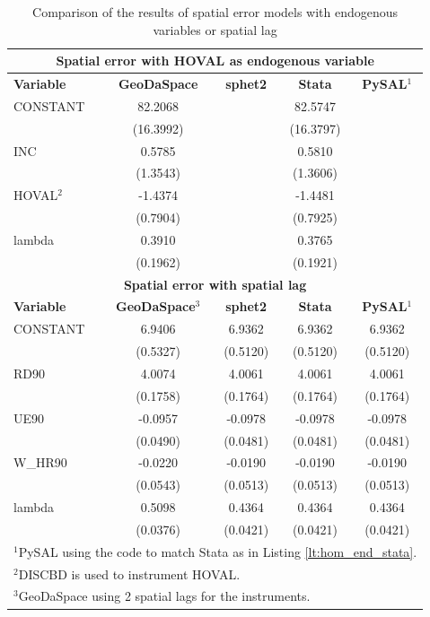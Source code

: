 \documentclass{article}
\begin{document}
\begin{table}[htpb]
\caption{Comparison of the results of spatial error models with endogenous variables or spatial lag}
\label{t:res_hom_endog}
\centering
\begin{small}
\begin{tabular}{l|cccc} \hline
\multicolumn{5}{c}{\textbf{Spatial error with HOVAL as endogenous variable}} \\ \hline
\textbf{Variable}&\textbf{GeoDaSpace}&\textbf{sphet2}&\textbf{Stata}&\textbf{PySAL$^1$}\\ \hline
CONSTANT&82.2068&&82.5747&\\
&(16.3992)&&(16.3797)&\\
INC&0.5785&&0.5810&\\
&(1.3543)&&(1.3606)&\\
HOVAL$^2$&-1.4374&&-1.4481&\\
&(0.7904)&&(0.7925)&\\
lambda&0.3910&&0.3765&\\
&(0.1962)&&(0.1921)&\\
\hline
\multicolumn{5}{c}{\textbf{Spatial error with spatial lag}} \\ \hline
\textbf{Variable}&\textbf{GeoDaSpace$^3$}&\textbf{sphet2}&\textbf{Stata}&\textbf{PySAL$^1$}\\ \hline
CONSTANT&6.9406&6.9362&6.9362&6.9362\\
&(0.5327)&(0.5120)&(0.5120)&(0.5120)\\
RD90&4.0074&4.0061&4.0061&4.0061\\
&(0.1758)&(0.1764)&(0.1764)&(0.1764)\\
UE90&-0.0957&-0.0978&-0.0978&-0.0978\\
&(0.0490)&(0.0481)&(0.0481)&(0.0481)\\
W\_HR90&-0.0220&-0.0190&-0.0190&-0.0190\\
&(0.0543)&(0.0513)&(0.0513)&(0.0513)\\
lambda&0.5098&0.4364&0.4364&0.4364\\
&(0.0376)&(0.0421)&(0.0421)&(0.0421)\\
\hline
\multicolumn{5}{l}{\scriptsize{$^1$PySAL using the code to match Stata as in Listing \ref{lt:hom_end_stata}.}} \\
\multicolumn{5}{l}{\scriptsize{$^2$DISCBD is used to instrument HOVAL.}} \\
\multicolumn{5}{l}{\scriptsize{$^3$GeoDaSpace using 2 spatial lags for the instruments.}} \\
\end{tabular}
\end{small}
\end{table}
\end{document}
